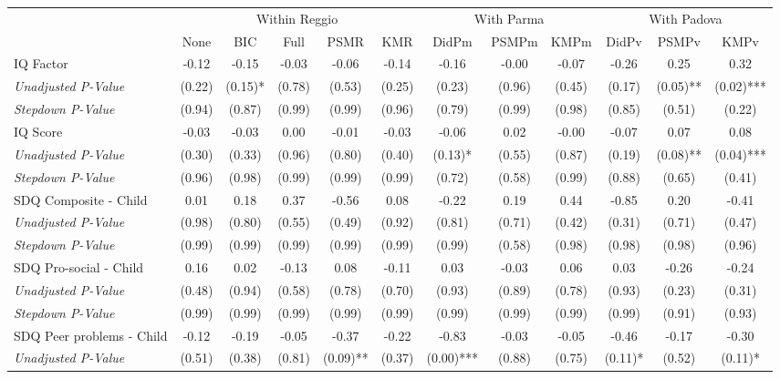 \begin{tabular}{l c c c c c c c c c c c}
\toprule
& \multicolumn{5}{c}{Within Reggio} & \multicolumn{3}{c}{With Parma} & \multicolumn{3}{c}{With Padova} \\\cmidrule(lr){2-6} \cmidrule(lr){7-9} \cmidrule(lr){10-12}
 & None & BIC & Full & PSMR & KMR & DidPm & PSMPm & KMPm & DidPv & PSMPv & KMPv \\
\midrule
IQ Factor & -0.12 & -0.15 & -0.03 & -0.06 & -0.14 & -0.16 & -0.00 & -0.07 & -0.26 & 0.25 & 0.32 \\
\quad \textit{Unadjusted P-Value} & (0.22) & (0.15)* & (0.78) & (0.53) & (0.25) & (0.23) & (0.96) & (0.45) & (0.17) & (0.05)** & (0.02)*** \\
\quad \textit{Stepdown P-Value} & (0.94) & (0.87) & (0.99) & (0.99) & (0.96) & (0.79) & (0.99) & (0.98) & (0.85) & (0.51) & (0.22) \\
IQ Score & -0.03 & -0.03 & 0.00 & -0.01 & -0.03 & -0.06 & 0.02 & -0.00 & -0.07 & 0.07 & 0.08 \\
\quad \textit{Unadjusted P-Value} & (0.30) & (0.33) & (0.96) & (0.80) & (0.40) & (0.13)* & (0.55) & (0.87) & (0.19) & (0.08)** & (0.04)*** \\
\quad \textit{Stepdown P-Value} & (0.96) & (0.98) & (0.99) & (0.99) & (0.99) & (0.72) & (0.58) & (0.99) & (0.88) & (0.65) & (0.41) \\
SDQ Composite - Child & 0.01 & 0.18 & 0.37 & -0.56 & 0.08 & -0.22 & 0.19 & 0.44 & -0.85 & 0.20 & -0.41 \\
\quad \textit{Unadjusted P-Value} & (0.98) & (0.80) & (0.55) & (0.49) & (0.92) & (0.81) & (0.71) & (0.42) & (0.31) & (0.71) & (0.47) \\
\quad \textit{Stepdown P-Value} & (0.99) & (0.99) & (0.99) & (0.99) & (0.99) & (0.99) & (0.58) & (0.98) & (0.98) & (0.98) & (0.96) \\
SDQ Pro-social - Child & 0.16 & 0.02 & -0.13 & 0.08 & -0.11 & 0.03 & -0.03 & 0.06 & 0.03 & -0.26 & -0.24 \\
\quad \textit{Unadjusted P-Value} & (0.48) & (0.94) & (0.58) & (0.78) & (0.70) & (0.93) & (0.89) & (0.78) & (0.93) & (0.23) & (0.31) \\
\quad \textit{Stepdown P-Value} & (0.99) & (0.99) & (0.99) & (0.99) & (0.99) & (0.99) & (0.99) & (0.99) & (0.99) & (0.91) & (0.93) \\
SDQ Peer problems - Child & -0.12 & -0.19 & -0.05 & -0.37 & -0.22 & -0.83 & -0.03 & -0.05 & -0.46 & -0.17 & -0.30 \\
\quad \textit{Unadjusted P-Value} & (0.51) & (0.38) & (0.81) & (0.09)** & (0.37) & (0.00)*** & (0.88) & (0.75) & (0.11)* & (0.52) & (0.11)* \\

\end{tabular}

